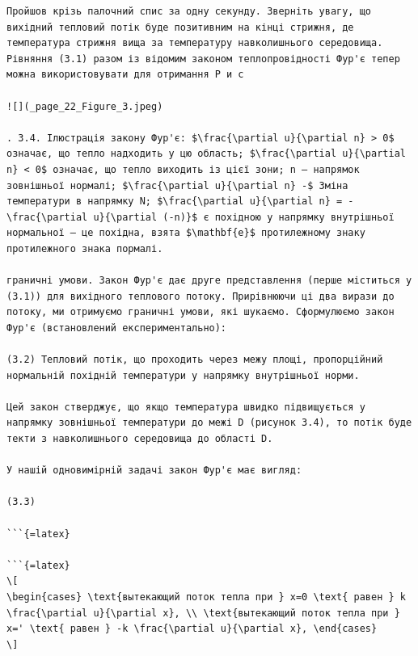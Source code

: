 \documentclass[
  ukrainian,
]{article}
\begin{document}
\begin{verbatim}
Пройшов крізь палочний спис за одну секунду. Зверніть увагу, що вихідний тепловий потік буде позитивним на кінці стрижня, де температура стрижня вища за температуру навколишнього середовища. Рівняння (3.1) разом із відомим законом теплопровідності Фур'є тепер можна використовувати для отримання Р и с

![](_page_22_Figure_3.jpeg)

. 3.4. Ілюстрація закону Фур'є: $\frac{\partial u}{\partial n} > 0$ означає, що тепло надходить у цю область; $\frac{\partial u}{\partial n} < 0$ означає, що тепло виходить із цієї зони; n — напрямок зовнішньої нормалі; $\frac{\partial u}{\partial n} -$ Зміна температури в напрямку N; $\frac{\partial u}{\partial n} = -\frac{\partial u}{\partial (-n)}$ є похідною у напрямку внутрішньої нормальної — це похідна, взята $\mathbf{e}$ протилежному знаку протилежного знака пормалі.

граничні умови. Закон Фур'є дає друге представлення (перше міститься у (3.1)) для вихідного теплового потоку. Прирівнюючи ці два вирази до потоку, ми отримуємо граничні умови, які шукаємо. Сформулюємо закон Фур'є (встановлений експериментально):

(3.2) Тепловий потік, що проходить через межу площі, пропорційний нормальній похідній температури у напрямку внутрішньої норми.

Цей закон стверджує, що якщо температура швидко підвищується у напрямку зовнішньої температури до межі D (рисунок 3.4), то потік буде текти з навколишнього середовища до області D.

У нашій одновимірній задачі закон Фур'є має вигляд:

(3.3)

```{=latex}

```{=latex}
\[
\begin{cases} \text{вытекающий поток тепла при } x=0 \text{ равен } k \frac{\partial u}{\partial x}, \\ \text{вытекающий поток тепла при } x=' \text{ равен } -k \frac{\partial u}{\partial x}, \end{cases}
\]
\end{verbatim}
\end{document}
